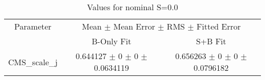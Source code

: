 \begin{table}
\centering
\caption{Values for nominal S=0.0}
\begin{tabular}{ccc}
\toprule
Parameter & \multicolumn{2}{c}{Mean $\pm$ Mean Error $\pm$ RMS $\pm$ Fitted Error}\\
 & B-Only Fit & S+B Fit\\
\midrule
CMS\_scale\_j & \num{0.644127} $\pm$ \num{0} $\pm$ \num{0} $\pm$ \num{0.0634119} & \num{0.656263} $\pm$ \num{0} $\pm$ \num{0} $\pm$ \num{0.0796182}\\
\bottomrule
\end{tabular}
\end{table}